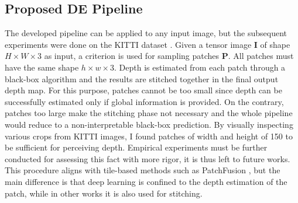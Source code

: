 \subsection{Proposed DE Pipeline}
The developed pipeline can be applied to any input image, but the subsequent experiments were done on the KITTI dataset \cite{KITTI}.
Given a tensor image $\mathbf{I}$ of shape $H \times W \times 3$ as input, a criterion is used for sampling patches $\mathbf{P}$.
All patches must have the same shape $h \times w \times 3$.
Depth is estimated from each patch through a black-box algorithm and the results are stitched together in the final output depth map.
For this purpose, patches cannot be too small since depth can be successfully estimated only if global information is provided.
On the contrary, patches too large make the stitching phase not necessary and the whole pipeline would reduce to a non-interpretable black-box prediction.
By visually inspecting various crops from KITTI images, I found patches of width and height of 150 to be sufficient for perceiving depth.
Empirical experiments must be further conducted for assessing this fact with more rigor, it is thus left to future works.
This procedure aligns with tile-based methods such as PatchFusion \cite{PatchFusion}, but the main difference is that deep learning is confined to the depth estimation of the patch, while in other works it is also used for stitching.

\vfill

